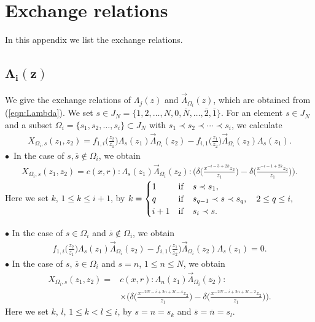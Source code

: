 \documentclass[pdftex]{sigma}
\numberwithin{equation}{section}
\begin{document}
\section{Exchange relations}\label{appendix:exchange}
In this appendix we list the exchange relations.

\subsection[\protect{$Lambda\_\{i\}(z)$}]
{$\boldsymbol{\Lambda_i(z)}$}
We give the exchange relations of $\Lambda_j(z)$ and $\overrightarrow{\Lambda}_{\Omega_i}(z)$,
which are obtained from (\ref{eqn:Lambda}).
We set $s \in J_N=\{1, 2, \dots, N, 0, \overline{N}, \dots, \overline{2}, \overline{1}\}$.
For an element $s \in J_N$ and a subset
$\Omega_i=\{s_1, s_2, \dots, s_i\} \subset J_N$ with $s_1 \prec s_2 \prec \cdots \prec s_i$, we calculate
\begin{gather*}
X_{\Omega_i,s}(z_1,z_2)=f_{1,i}\bigg(\frac{z_2}{z_1}\bigg)\Lambda_s(z_1) \overrightarrow{\Lambda}_{\Omega_i}(z_2)-
f_{i,1}\bigg(\frac{z_1}{z_2}\bigg)\overrightarrow{\Lambda}_{\Omega_i}(z_2)\Lambda_s(z_1).
\end{gather*}
$\bullet$~In the case of $s, \overline{s} \notin \Omega_i$, we obtain
\begin{gather}
{X_{\Omega_i,s}(z_1,z_2)}=
c(x,r){:}\Lambda_s(z_1)\overrightarrow{\Lambda}_{\Omega_i}(z_2){:}
\bigg(\delta\bigg(\frac{x^{-i-3+2k} z_2}{z_1}\bigg)-
\delta\bigg(\frac{x^{-i-1+2k} z_2}{z_1}\bigg)\bigg).
\label{exchange:L1}
\end{gather}
Here we set $k$, $1\leq k \leq i+1$, by
$k=\begin{cases}
1&{\rm if}\quad s\prec s_1,\\
q&{\rm if}\quad s_{q-1}\prec s \prec s_q,\quad 2 \leq q \leq i,\\
i+1&{\rm if}\quad s_i \prec s.
\end{cases}$

\noindent
$\bullet$
In the case of $s \in \Omega_i$ and $\overline{s} \notin \Omega_i$,
we obtain
\begin{gather}
f_{1,i}\bigg(\frac{z_2}{z_1}\bigg)\Lambda_s(z_1)\overrightarrow{\Lambda}_{\Omega_i}(z_2)-
f_{i,1}\bigg(\frac{z_1}{z_2}\bigg)\overrightarrow{\Lambda}_{\Omega_i}(z_2)\Lambda_s(z_1)=0.
\label{exchange:L2}
\end{gather}
$\bullet$
In the case of $s$, $\overline{s} \in \Omega_i$ and $s=n$,
$1\leq n \leq N$, we obtain
\begin{align}
X_{\Omega_i,s}(z_1,z_2)={}&
c(x,r){:}\Lambda_n(z_1)\overrightarrow{\Lambda}_{\Omega_i}(z_2){:}\nonumber
\\
&\times\bigg(\delta\bigg(\frac{x^{-2N-i+2n+2l-4}z_2}{z_1}\bigg)-
\delta\bigg(\frac{x^{-2N-i+2n+2l-2} z_2}{z_1}\bigg)\bigg).
\label{exchange:L3}
\end{align}
Here we set $k$, $l$, $1\leq k<l \leq i$, by $s=n=s_k$ and
$\overline{s}=\overline{n}=s_l$.
\end{document}
